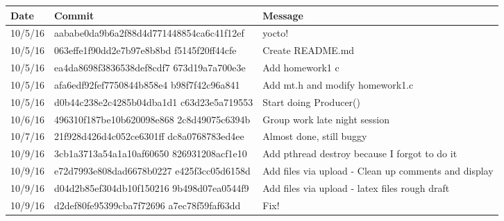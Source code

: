 \documentclass[letterpaper,10pt,draftclsnofoot,titlepage,onecolumn]{IEEEtran}
\begin{document}
\begin{center}

 \begin{tabular}{| m{2cm} | m{8cm} | m{4cm} | } 
\hline
 Date & Commit & Message \\ [0.5ex] 
 \hline\hline
  10/5/16 & aababe0da9b6a2f88d4d771448854ca6c41f12ef & yocto! \\
 \hline
  10/5/16 & 063effe1f90dd2e7b97e8b8bd f5145f20ff44cfe & Create README.md \\
 \hline
  10/5/16 & ea4da8698f3836538def8cdf7 673d19a7a700e3e & Add homework1 c \\
 \hline
  10/5/16 & afa6edf92fef7750844b858e4 b98f7f42c96a841 & Add mt.h and modify homework1.c \\
 \hline
  10/5/16 & d0b44c238e2c4285b04dba1d1 c63d23e5a719553 & Start doing Producer() \\
 \hline
 
  10/6/16 & 496310f187be10b620098e868 2c8d49075c6394b & Group work late night session \\
 \hline
 
   10/7/16 & 21f928d426d4c052ce6301ff dc8a0768783ed4ee & Almost done, still buggy \\
 \hline
 
   10/9/16 & 3cb1a3713a54a1a10af60650 826931208acf1e10 & Add pthread destroy because I forgot to do it \\
 \hline
 
   10/9/16 & e72d7993e808dad6678b0227 e425f3cc05d6158d & Add files via upload - Clean up comments and display\\
 \hline
 
   10/9/16 & d04d2b85ef304db10f150216 9b498d07ea0544f9 & Add files via upload - latex files rough draft\\
 \hline
 
   10/9/16 & d2def80fe95399cba7f72696 a7ec78f59faf63dd & Fix!\\
 \hline
 
\end{tabular}
\end{center}
	
\clearpage
\end{document}

